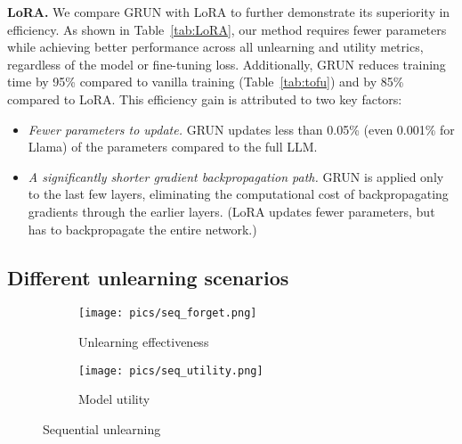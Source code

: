 \noindent\textbf{LoRA.} We compare GRUN with LoRA to further demonstrate its superiority in efficiency. As shown in Table~\ref{tab:LoRA}, our method requires fewer parameters while achieving better performance across all unlearning and utility metrics, regardless of the model or fine-tuning loss. Additionally, GRUN reduces training time by 95\% compared to vanilla training (Table~\ref{tab:tofu}) and by 85\% compared to LoRA. This efficiency gain is attributed to two key factors:
\begin{itemize}
    \item \textit{Fewer parameters to update.} GRUN updates less than 0.05\% (even 0.001\% for Llama) of the parameters compared to the full LLM.
    \item \textit{A significantly shorter gradient backpropagation path.} GRUN is applied only to the last few layers, eliminating the computational cost of backpropagating gradients through the earlier layers. (LoRA updates fewer parameters, but has to backpropagate the entire network.)
\end{itemize}

\subsection{Different unlearning scenarios}
\label{exp:seq}

\begin{figure}[t]
    \centering
    \begin{subfigure}[b]{0.499\linewidth}
        \centering
        \texttt{[image: pics/seq\_forget.png]}
        \vspace{-0.25in}
        \caption{Unlearning effectiveness}
        \label{fig:seq_forget}
    \end{subfigure}\hfill
    \begin{subfigure}[b]{0.499\linewidth}
        \centering
        \texttt{[image: pics/seq\_utility.png]}
        \vspace{-0.25in}
        \caption{Model utility}
        \label{fig:seq_utility}
    \end{subfigure}
    \vspace{-0.25in}
    \caption{Sequential unlearning}
    \label{fig:seq}
\end{figure}

